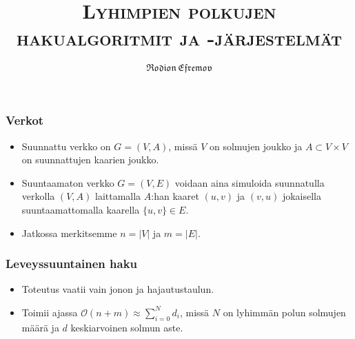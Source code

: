 \documentclass{beamer}
\title{{\rmfamily\scshape Lyhimpien polkujen hakualgoritmit ja -järjestelmät}}
\author{$\mathfrak{Rodion \, Efremov}$}
\date{}
\institute{Tietojenkäsittelytieteen laitos, Helsingin yliopisto}
\begin{document}
\maketitle

\begin{frame}
\frametitle{Verkot}
\begin{itemize}
\item Suunnattu verkko on $G = (V, A)$, missä $V$ on solmujen joukko ja $A \subset V \times V$ on suunnattujen kaarien joukko.

\item Suuntaamaton verkko $G = (V, E)$ voidaan aina simuloida suunnatulla verkolla $(V, A)$ laittamalla $A$:han kaaret $(u, v)$ ja $(v, u)$ jokaisella suuntaamattomalla kaarella $\{u, v\} \in E$.

\item Jatkossa merkitsemme $n = |V|$ ja $m = |E|$.
\end{itemize}
\end{frame}

\begin{frame}
\frametitle{Leveyssuuntainen haku}
\begin{itemize}
\item Toteutus vaatii vain jonon ja hajautustaulun.
\item Toimii ajassa $\mathcal{O}(n + m) \approx \sum_{i = 0}^N d_i$, missä $N$ on lyhimmän polun solmujen määrä ja $d$ keskiarvoinen solmun aste.
\end{itemize}
\end{frame}
\end{document}
